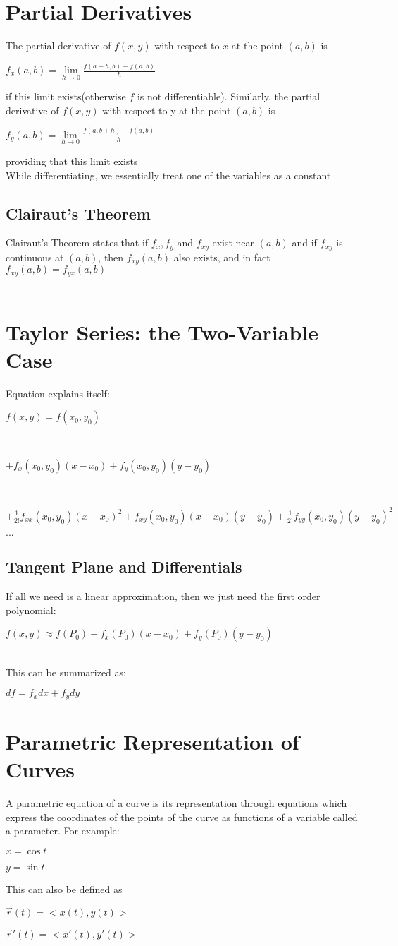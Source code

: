 \documentclass[12pt]{report}
\begin{document}
	\section{Partial Derivatives}
		The partial derivative of $f(x,y)$ with respect to $x$ at the point $(a,b)$ is\\
		\centerline{$f_x(a,b) = \lim\limits_{h\rightarrow 0} \frac{f(a+h, b) - f(a,b)}{h}$}
		if this limit exists(otherwise $f$ is not differentiable). Similarly, the partial derivative of $f(x,y)$ with respect to y at the point $(a,b)$ is \\
		\centerline{$f_y(a,b) = \lim\limits_{h\rightarrow 0} \frac{f(a, b+h) - f(a,b)}{h}$}
		providing that this limit exists\\
		While differentiating, we essentially treat one of the variables as a constant
		\subsection{Clairaut's Theorem}
			Clairaut's Theorem states that if $f_x, f_y$ and $f_{xy}$ exist near $(a,b)$ and if $f_{xy}$ is continuous at $(a,b)$, then $f_{xy}(a,b)$ also exists, and in fact $f_{xy}(a,b) = f_{yx}(a,b)$
			\\
			\\
	\section{Taylor Series: the Two-Variable Case}
		Equation explains itself:\\
		\centerline{$f(x,y) = f(x_0, y_0)$}\\
		\centerline{$+ f_x(x_0,y_0)(x-x_0) + f_y(x_0,y_0)(y-y_0)$}\\
		\centerline{$+ \frac{1}{2!}f_{xx}(x_0,y_0)(x-x_0)^2 + f_{xy}(x_0, y_0)(x-x_0)(y-y_0) + \frac{1}{2!}f_{yy}(x_0,y_0)(y-y_0)^2$}
		\centerline{$...$}
		\subsection{Tangent Plane and Differentials}
			If all we need is a linear approximation, then we just need the first order polynomial:\\
			\centerline{$f(x,y) \approx f(P_0) + f_x(P_0)(x-x_0) + f_y(P_0)(y-y_0)$}\\
			This can be summarized as:\\
			\centerline{$df = f_xdx + f_ydy$}
	\section{Parametric Representation of Curves}
		A parametric equation of a curve is its representation through equations which express the coordinates of the points of the curve as functions of a variable called a parameter. For example:\\
		\centerline{$x = \cos t$}
		\centerline{$y = \sin t$}
		This can also be defined as \\
		\centerline{$\vec{r}(t) = <x(t), y(t)>$}
		\centerline{$\vec{r}'(t) = <x'(t), y'(t)>$}
\end{document}
